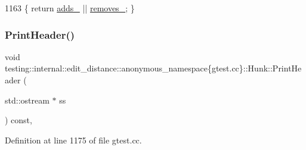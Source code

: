 \begin{DoxyCode}
1163 \{ \textcolor{keywordflow}{return} \hyperlink{classtesting_1_1internal_1_1edit__distance_1_1anonymous__namespace_02gtest_8cc_03_1_1Hunk_aebe5a95d3f4d959662f95e4d6b759c87}{adds\_} || \hyperlink{classtesting_1_1internal_1_1edit__distance_1_1anonymous__namespace_02gtest_8cc_03_1_1Hunk_afef2d4c5c0b9cb9567d4f778f6748828}{removes\_}; \}
\end{DoxyCode}
\mbox{\label{classtesting_1_1internal_1_1edit__distance_1_1anonymous__namespace_02gtest_8cc_03_1_1Hunk_a5752d6e583b7363218a4c61ffdbffb63}} 
\subsubsection{\texorpdfstring{Print\+Header()}{PrintHeader()}}
{\footnotesize\ttfamily void testing\+::internal\+::edit\+\_\+distance\+::anonymous\+\_\+namespace\{gtest.\+cc\}\+::Hunk\+::\+Print\+Header (\begin{DoxyParamCaption}\item[{std\+::ostream $\ast$}]{ss }\end{DoxyParamCaption}) const\hspace{0.3cm}{\ttfamily [inline]}, {\ttfamily [private]}}



Definition at line 1175 of file gtest.\+cc.


